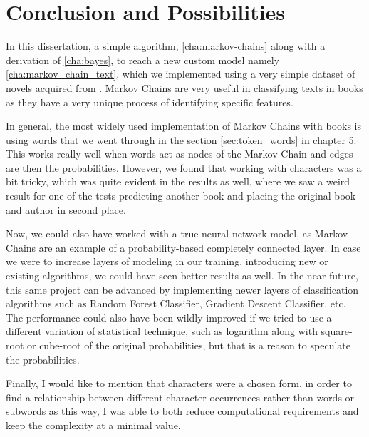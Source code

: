 

\chapter{Conclusion and Possibilities}
\label{cha:conclusion}

In this dissertation, a simple algorithm, \ref{cha:markov-chains} along with a derivation of \ref{cha:bayes}, to reach a new custom model namely \ref{cha:markov_chain_text}, which we implemented using a very simple dataset of novels acquired from \textcite{project-gutenburg}. Markov Chains are very useful in classifying texts in books as they have a very unique process of identifying specific features. 

In general, the most widely used implementation of Markov Chains with books is using words that we went through in the section \ref{sec:token_words} in chapter 5. This works really well when words act as nodes of the Markov Chain and edges are then the probabilities. However, we found that working with characters was a bit tricky, which was quite evident in the results as well, where we saw a weird result for one of the tests predicting another book and placing the original book and author in second place. 

Now, we could also have worked with a true neural network model, as Markov Chains are an example of a probability-based completely connected layer. In case we were to increase layers of modeling in our training, introducing new or existing algorithms, we could have seen better results as well. In the near future, this same project can be advanced by implementing newer layers of classification algorithms such as Random Forest Classifier, Gradient Descent Classifier, etc. The performance could also have been wildly improved if we tried to use a different variation of statistical technique, such as logarithm along with square-root or cube-root of the original probabilities, but that is a reason to speculate the probabilities. 

Finally, I would like to mention that characters were a chosen form, in order to find a relationship between different character occurrences rather than words or subwords as this way, I was able to both reduce computational requirements and keep the complexity at a minimal value.



